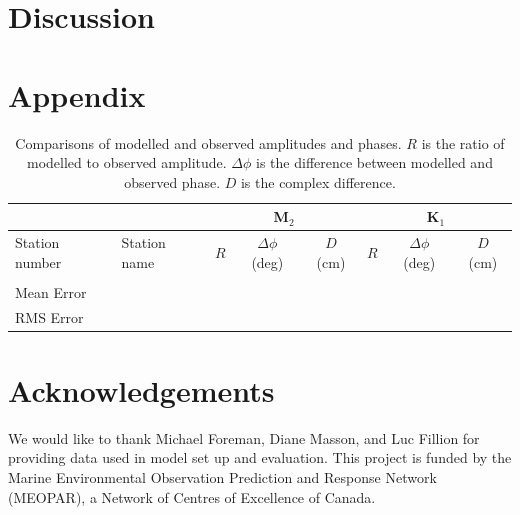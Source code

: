 \documentclass[pdftex,10pt]{article}
\begin{document}
\section{Discussion}\label{sec:diss}

\section{Appendix}
\begin{table}[h]
\centering 
\begin{tabular}{l l c c c c c c} 
\hline 
& & \multicolumn{3}{c}{M$_2$} & \multicolumn{3}{c}{K$_1$} \\ 
\hline 
Station number & Station name & $R$ & $ \Delta \phi$ (deg) & $D$ (cm) & $R$ & $ \Delta \phi$ (deg) & $D$ (cm) \\
\hline 
               &              &     &                      &          &     &                      &          \\
\hline   
Mean Error     &              &     &                      &          &     &                      &          \\
RMS Error      &              &     &                      &          &     &                      &          \\
\hline  
\end{tabular}
\caption{Comparisons of modelled and observed amplitudes and phases. $R$ is the ratio of modelled to observed amplitude. $\Delta \phi$ is the difference between modelled and observed phase. $D$ is the complex difference. }
\label{tab:comparison} 
\end{table}

\section{Acknowledgements}\label{sec:ack}
We would like to thank Michael Foreman, Diane Masson, and Luc Fillion for providing data used in model set up and evaluation. This project is funded by the Marine Environmental Observation Prediction and Response Network (MEOPAR), a Network of Centres of Excellence of Canada.  



\end{document}
